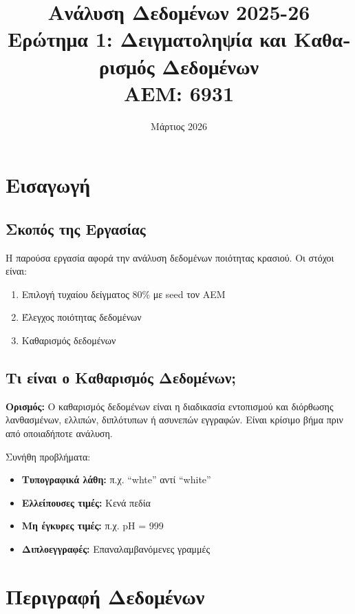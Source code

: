\documentclass[12pt,a4paper]{article}
\title{
    \textbf{\textgreek{Ανάλυση Δεδομένων} 2025-26}\\[0.3cm]
    \large \textgreek{Ερώτημα 1: Δειγματοληψία και Καθαρισμός Δεδομένων}\\[0.2cm]
    \normalsize AEM: 6931
}
\author{}
\date{\textgreek{Μάρτιος} 2026}
\begin{document}
\maketitle
\tableofcontents
\newpage

\section{\textgreek{Εισαγωγή}}

\subsection{\textgreek{Σκοπός της Εργασίας}}

\textgreek{Η παρούσα εργασία αφορά την ανάλυση δεδομένων ποιότητας κρασιού. Οι στόχοι είναι:}

\begin{enumerate}
    \item \textgreek{Επιλογή τυχαίου δείγματος 80\% με seed τον ΑΕΜ}
    \item \textgreek{Έλεγχος ποιότητας δεδομένων}
    \item \textgreek{Καθαρισμός δεδομένων}
\end{enumerate}

\subsection{\textgreek{Τι είναι ο Καθαρισμός Δεδομένων;}}

\begin{mdframed}[style=infobox]
\textbf{\textgreek{Ορισμός:}} \textgreek{Ο καθαρισμός δεδομένων είναι η διαδικασία εντοπισμού και διόρθωσης λανθασμένων, ελλιπών, διπλότυπων ή ασυνεπών εγγραφών. Είναι κρίσιμο βήμα πριν από οποιαδήποτε ανάλυση.}
\end{mdframed}

\textgreek{Συνήθη προβλήματα:}
\begin{itemize}
    \item \textbf{\textgreek{Τυπογραφικά λάθη:}} \textgreek{π.χ. ``whte'' αντί ``white''}
    \item \textbf{\textgreek{Ελλείπουσες τιμές:}} \textgreek{Κενά πεδία}
    \item \textbf{\textgreek{Μη έγκυρες τιμές:}} \textgreek{π.χ. pH = 999}
    \item \textbf{\textgreek{Διπλοεγγραφές:}} \textgreek{Επαναλαμβανόμενες γραμμές}
\end{itemize}

\section{\textgreek{Περιγραφή Δεδομένων}}
\end{document}
